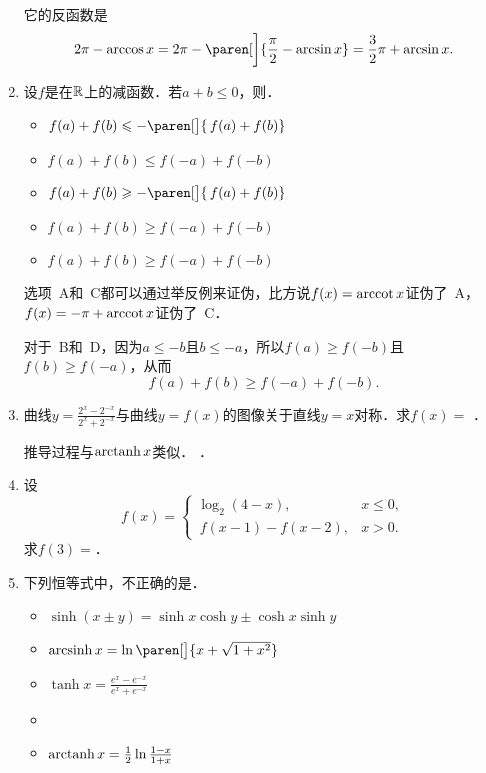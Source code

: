 \begin{enumerate}
  \ifshowsol
    它的反函数是
    \begin{equation*}
      2\pi - \arccos x
      = 2\pi - \paren[\bigg]{\frac\pi2 - \arcsin x}
      = \frac32\pi + \arcsin x.
    \end{equation*}
  \fi

\item 设\(f\)是在\(\mathbb{R}\)上的减函数．若\(a + b \le 0\)，则\uline{\makebox[6em]{}}．
  \begin{itemize}
    \renewcommand{\labelitemi}{\faCircleThin}
  \item \(f(a) + f(b) \le -\paren[\big]{\,f(a) + f(b)}\)
  \item \(f(a) + f(b) \le f(-a) + f(-b)\)
  \item \(f(a) + f(b) \ge -\paren[\big]{\,f(a) + f(b)}\)
    \ifshowsol
  \item[\faCircle] \(f(a) + f(b) \ge f(-a) + f(-b)\)
    \else
  \item \(f(a) + f(b) \ge f(-a) + f(-b)\)
    \fi
  \end{itemize}

  \ifshowsol
    选项~A和~C都可以通过举反例来证伪，比方说\(f(x) = \operatorname{arccot} x\)证伪了~A，\(f(x) = -\pi + \operatorname{arccot} x\)证伪了~C．

    对于~B和~D，因为\(a \le -b\)且\(b \le -a\)，所以\(f(a) \ge f(-b)\)且\(f(b) \ge f(-a)\)，从而
    \begin{equation*}
      f(a) + f(b) \ge f(-a) + f(-b).
    \end{equation*}
  \fi

\item 曲线\(y = \frac{2^x-2^{-x}}{2^x+2^{-x}}\)与曲线\(y = f(x)\)的图像关于直线\(y = x\)对称．求\(f(x) =\)
  \ifshowsol
    {\setlength{\ULdepth}{1.15ex}%
      \uline{}}．

    推导过程与\(\operatorname{arctanh} x\)类似．
  \else
  \uline{\makebox[6em]{}}．
  \fi

\item 设
  \[
    f(x) =
    \begin{cases}
      \log_2 (4-x), & x \le 0, \\
      \,f(x-1) - f(x-2), & x > 0.
    \end{cases}
  \]
  求\(f(3) =\)\uline{}．

\item 下列恒等式中，不正确的是\uline{\makebox[6em]{}}．
  \begin{itemize}
    \renewcommand{\labelitemi}{\faCircleThin}
  \item \(\sinh(x \pm y) = \sinh x \cosh y \pm \cosh x \sinh y\)
  \item \(\arcsinh x = \ln\paren[\big]{x + \sqrt{1+x^2}}\)
  \item \(\tanh x = \frac{e^x-e^{-x}}{e^x+e^{-x}}\)
    \ifshowsol
  \item[\faCircle]
    \else
  \item
    \fi
    \(\operatorname{arctanh} x = \frac12 \ln\frac{1-x}{1+x}\)
  \end{itemize}
\end{enumerate}
\fi

